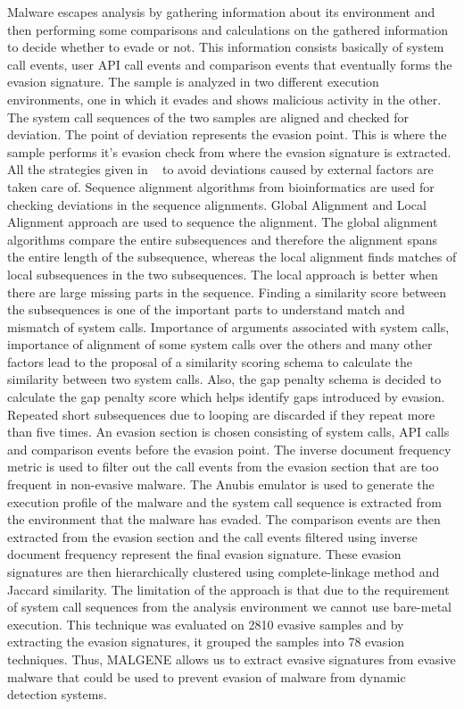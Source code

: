 \documentclass[11pt]{article}
\begin{document}
		Malware escapes analysis by gathering information about its environment and then performing some comparisons and calculations on the gathered information to decide whether to evade or not. This information consists basically of system call events, user API call events and comparison events that eventually forms the evasion signature. The sample is analyzed in two different execution environments, one in which it evades and shows malicious activity in the other. The system call sequences of the two samples are aligned and checked for deviation. The point of deviation represents the evasion point. This is where the sample performs it’s evasion check from where the evasion signature is extracted. All the strategies given in ~\cite{kirat2014barecloud} to avoid deviations caused by external factors are taken care of. Sequence alignment algorithms from bioinformatics are used for checking deviations in the sequence alignments. Global Alignment and Local Alignment approach are used to sequence the alignment. The global alignment algorithms compare the entire subsequences and therefore the alignment spans the entire length of the subsequence, whereas the local alignment finds matches of local subsequences in the two subsequences. The local approach is better when there are large missing parts in the sequence. Finding a similarity score between the subsequences is one of the important parts to understand match and mismatch of system calls. Importance of arguments associated with system calls, importance of alignment of some system calls over the others and many other factors lead to the proposal of a similarity scoring schema to calculate the similarity between two system calls. Also, the gap penalty schema is decided to calculate the gap penalty score which helps identify gaps introduced by evasion. Repeated short subsequences due to looping are discarded if they repeat more than five times.
		An evasion section is chosen consisting of system calls, API calls and comparison events before the evasion point. The inverse document frequency metric is used to filter out the call events from the evasion section that are too frequent in non-evasive malware. The Anubis emulator is used to generate the execution profile of the malware and the system call sequence is extracted from the environment that the malware has evaded. The comparison events are then extracted from the evasion section and the call events filtered using inverse document frequency represent the final evasion signature. These evasion signatures are then hierarchically clustered using complete-linkage method and Jaccard similarity.
		The limitation of the approach is that due to the requirement of system call sequences from the analysis environment we cannot use bare-metal execution. This technique was evaluated on 2810 evasive samples and by extracting the evasion signatures, it grouped the samples into 78 evasion techniques. Thus, MALGENE allows us to extract evasive signatures from evasive malware that could be used to prevent evasion of malware from dynamic detection systems.
\end{document}
